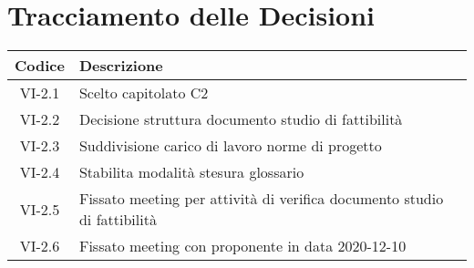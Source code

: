\section*{Tracciamento delle Decisioni}

\begin{center}
	\begin{longtable}{|c|p{14.5cm}|}
	\hline
	\rowcolor{lighter-grayer}
	\textbf{Codice} & \textbf{Descrizione} \\
	\hline
	\endfirsthead

	\hline
	VI-2.1 & Scelto capitolato C2 \\
	VI-2.2 & Decisione struttura documento studio di fattibilità \\
	VI-2.3 & Suddivisione carico di lavoro norme di progetto \\
	VI-2.4 & Stabilita modalità stesura glossario \\
	VI-2.5 & Fissato meeting per attività di verifica documento studio di fattibilità \\
	VI-2.6 & Fissato meeting con proponente in data 2020-12-10 \\
	\hline

	\end{longtable}
\end{center}